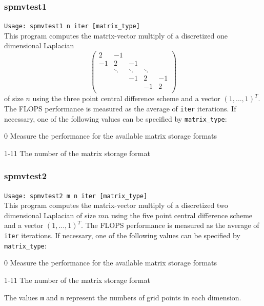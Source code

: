 \documentclass[a4paper]{article}
\newcommand{\namelistlabel}[1]{\mbox{#1}\hfill}
\newenvironment{namelist}[1]{%
\begin{list}{}
  {\let\makelabel\namelistlabel
  \settowidth{\labelwidth}{#1}
  \setlength{\leftmargin}{1.1\labelwidth}}
  }{%
\end{list}}
\begin{document}
\subsubsection{spmvtest1}

\verb+Usage: spmvtest1 n iter [matrix_type]+\\

This program computes the matrix-vector multiply of a discretized one dimensional Laplacian
\[
\left(
\begin{array}{ccccc}
2 & -1 &   &  &   \\
-1 & 2 & -1 &  &   \\
  & \ddots  & \ddots  & \ddots  &   \\
  &   & -1 & 2 & -1 \\
  &   &   & -1 & 2 \\
\end{array}
\right)
\]
of size $n$ using the three point central difference scheme
and a vector $(1,\dots,1)^T$.
The FLOPS performance is measured as the average of {\tt iter}
iterations.
If necessary, one of the following values can be specified by {\tt matrix\_type}:
\begin{namelist}{XXXXXXXXXXXXXXXXXXXX}
\item[0] Measure the performance for the available matrix storage formats
\item[1-11] The number of the matrix storage format
\end{namelist}

\subsubsection{spmvtest2}

\verb+Usage: spmvtest2 m n iter [matrix_type]+\\

This program computes the matrix-vector multiply of a 
discretized two dimensional Laplacian of size $mn$ using 
the five point central difference scheme 
and a vector $(1,\dots,1)^T$. 
The FLOPS performance is measured as the average of {\tt iter}
iterations.
If necessary, one of the following values can be specified by {\tt matrix\_type}:
\begin{namelist}{XXXXXXXXXXXXXXXXXXXX}
\item[0] Measure the performance for the available matrix storage formats
\item[1-11] The number of the matrix storage format
\end{namelist}
The values {\tt m} and {\tt n} represent the numbers of grid points 
in each dimension. 
\end{document}
